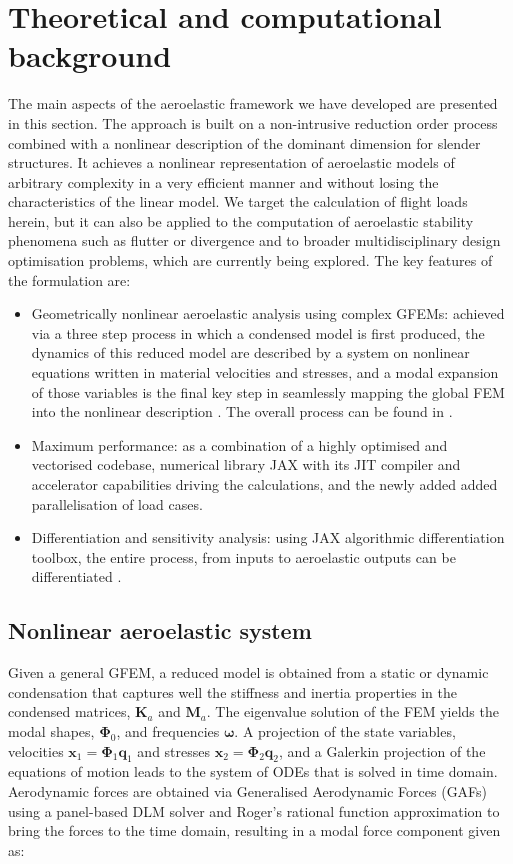 \documentclass[11pt]{article}
\begin{document}
\section{Theoretical and computational background}
\label{sec:org85f0cd2}
The main aspects of the aeroelastic framework we have developed are presented in this section. 
The approach is built on a non-intrusive reduction order process combined with a nonlinear description of the dominant dimension for slender structures. It achieves a nonlinear representation of aeroelastic models of arbitrary complexity in a very efficient manner and without losing the characteristics of the linear model. We target the calculation of flight loads herein, but it can also be applied to the computation of aeroelastic stability phenomena such as flutter or divergence \cite{CEA2023} and to broader multidisciplinary design optimisation problems, which are currently being explored.
The key features of the formulation are:

\begin{itemize}
\item Geometrically nonlinear aeroelastic analysis using complex GFEMs: achieved via a three step process in which a condensed model is first produced, the dynamics of this reduced model are described by a system on nonlinear equations \cite{HODGES2003} written in material velocities and stresses, and a modal expansion of those variables is the final key step in seamlessly mapping the global FEM into the nonlinear description \cite{PALACIOS2011}. The overall process can be found in \cite{CEA2021a}.
\item Maximum performance: as a combination of a highly optimised and vectorised codebase, numerical library JAX with its JIT compiler and accelerator capabilities  driving the calculations, and the newly added added parallelisation of load cases.
\item Differentiation and sensitivity analysis: using JAX algorithmic differentiation toolbox, the entire process, from inputs to aeroelastic outputs can be differentiated \cite{CEA2024a}.
\end{itemize}

\subsection{Nonlinear aeroelastic system}
\label{sec:org382dc9e}
Given a general GFEM, a reduced model is obtained from a static or dynamic condensation that captures well the stiffness and inertia properties in the condensed matrices, \(\pmb{K}_a\) and \(\pmb{M}_a\). The eigenvalue solution of the FEM yields the modal shapes, \(\pmb \Phi_0\), and frequencies \(\pmb \omega\). A projection of the state variables, velocities \(\pmb{x}_1 = \pmb{\Phi}_1\pmb{q}_1\) and stresses \(\pmb{x}_2 = \pmb{\Phi}_2\pmb{q}_2\), and a Galerkin projection of the equations of motion leads to the system of ODEs that is solved in time domain. 
Aerodynamic forces are obtained via Generalised Aerodynamic Forces (GAFs) using a panel-based DLM solver and Roger's rational function approximation\cite{Roger1977} to bring the forces to the time domain, resulting in a modal force component given as:
\end{document}
